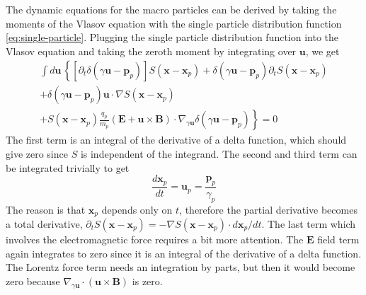 The dynamic equations for the macro particles can be derived by taking
the moments of the Vlasov equation with the single particle
distribution function \eqref{eq:single-particle}. Plugging the single
particle distribution function into the Vlasov equation and taking the
zeroth moment by integrating over $\mathbf{u}$, we get
\begin{equation}
\begin{split}
    \int d\mathbf{u}\,\left\{ \left[ \partial_t \delta(\gamma \mathbf{u} - \mathbf{p}_p) \right]S(\mathbf{x} - \mathbf{x}_p) + \delta(\gamma \mathbf{u} - \mathbf{p}_p)\partial_tS(\mathbf{x} - \mathbf{x}_p) \right. \\
    + \delta(\gamma \mathbf{u} - \mathbf{p}_p) \mathbf{u}\cdot\nabla S(\mathbf{x} - \mathbf{x}_p) \\
    \left. + S(\mathbf{x} - \mathbf{x}_p)\frac{q_p}{m_p}(\mathbf{E} + \mathbf{u}\times \mathbf{B})\cdot \nabla_{\gamma \mathbf{u}}\delta(\gamma \mathbf{u} - \mathbf{p}_p) \right\} = 0
\end{split}
\end{equation}
The first term is an integral of the derivative of a delta function,
which should give zero since $S$ is independent of the integrand. The
second and third term can be integrated trivially to get
\begin{equation}
  \label{eq:eom-position}
\frac{d\mathbf{x}_p}{dt} = \mathbf{u}_p = \frac{\mathbf{p}_p}{\gamma_p}
\end{equation}
The reason is that $\mathbf{x}_p$ depends only on $t$, therefore
the partial derivative becomes a total derivative,
$\partial_tS(\mathbf{x} - \mathbf{x}_p) = -\nabla
S(\mathbf{x} - \mathbf{x}_p) \cdot d\mathbf{x}_p/dt$. The
last term which involves the electromagnetic force requires a bit more
attention. The $\mathbf{E}$ field term again integrates to zero
since it is an integral of the derivative of a delta function. The
Lorentz force term needs an integration by parts, but then it would
become zero because $\nabla_{\gamma
  \mathbf{u}}\cdot(\mathbf{u}\times \mathbf{B})$ is zero.



